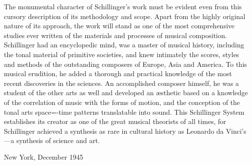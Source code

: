 The monumental character of Schillinger's work must be evident even from this
cursory description of its methodology and scope. Apart from the highly
original nature of its approach, the work will stand as one of the most
comprehensive studies ever written of the materials and processes of musical
composition. Schillinger had an encyclopedic mind, was a master of musical
history, including the tonal material of primitive societies, and knew
intimately the scores, styles and methods of the outstanding composers of
Europe, Asia and America. To this musical erudition, he added a thorough and
practical knowledge of the most recent discoveries in the sciences. An
accomplished composer himself, he was  a student of the other arts as well and
developed an \ae sthetic based on a knowledge of the correlation of music with
the forms of motion, and the conception of the tonal arts space=-time patterns
translatable into sound. This Schillinger System establishes its creator as one
of the great musical theorists of all times, for Schillinger achieved a
synthesis as rare in cultural history as Leonardo da Vinci's---a synthesis of
science and art.

\vspace{2ex}

\noindent New York, December 1945
